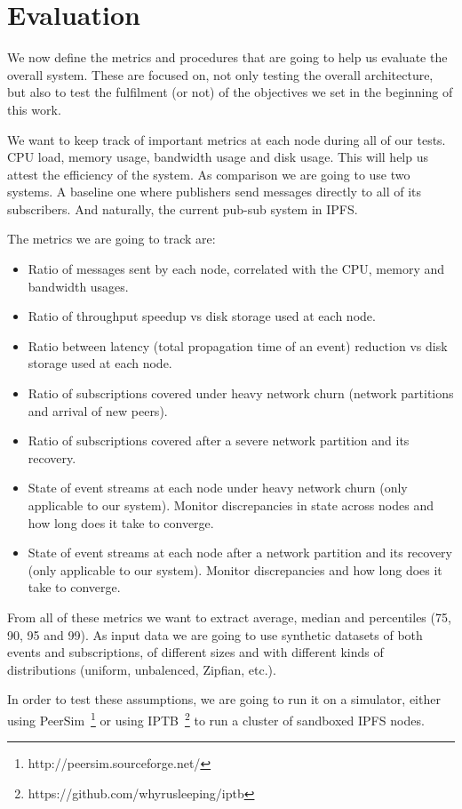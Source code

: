 
%
%

\section{Evaluation}

We now define the metrics and procedures that are going to help us evaluate the overall system. These are focused on, not only
testing the overall architecture, but also to test the fulfilment (or not) of the objectives we set in the beginning of this
work.

We want to keep track of important metrics at each node during all of our tests. CPU load, memory usage, bandwidth usage and disk usage. This will help us attest the efficiency of the system. As comparison we are going to use two systems. A baseline one where publishers send messages directly to all of its subscribers. And naturally, the current pub-sub system in IPFS.

The metrics we are going to track are:

\begin{itemize}
  \item Ratio of messages sent by each node, correlated with the CPU, memory and bandwidth usages.
  \item Ratio of throughput speedup vs disk storage used at each node.
  \item Ratio between latency (total propagation time of an event) reduction vs disk storage used at each node.
  \item Ratio of subscriptions covered under heavy network churn (network partitions and arrival of new peers).
  \item Ratio of subscriptions covered after a severe network partition and its recovery.
  \item State of event streams at each node under heavy network churn (only applicable to our system). Monitor discrepancies in state across nodes and how long does it take to converge.
  \item State of event streams at each node after a network partition and its recovery (only applicable to our system). Monitor discrepancies and how long does it take to converge.
\end{itemize}

From all of these metrics we want to extract average, median and percentiles (75, 90, 95 and 99). As input data we are going to use synthetic datasets of both events and subscriptions, of different sizes and with different kinds of distributions (uniform, unbalenced, Zipfian, etc.).

In order to test these assumptions, we are going to run it on a simulator, either using PeerSim~\footnote{http://peersim.sourceforge.net/} or using IPTB~\footnote{https://github.com/whyrusleeping/iptb} to run a cluster of sandboxed IPFS nodes.
